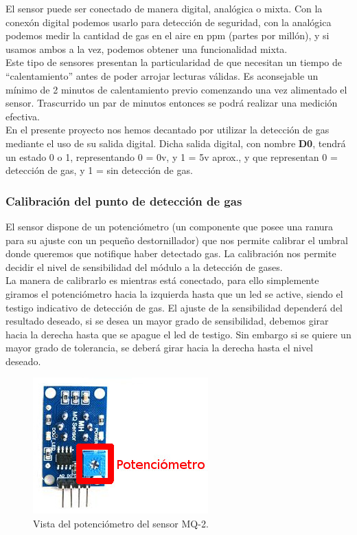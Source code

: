El sensor puede ser conectado de manera digital, analógica o mixta. Con la conexón digital podemos usarlo para detección de seguridad, con la analógica podemos medir la cantidad 
de gas en el aire en ppm (partes por millón), y si usamos ambos a la vez, podemos obtener una funcionalidad mixta.\\

Este tipo de sensores presentan la particularidad de que necesitan un tiempo de “calentamiento” antes de poder arrojar lecturas válidas. Es aconsejable un mínimo de 2 minutos
de calentamiento previo comenzando una vez alimentado el sensor. Trascurrido un par de minutos entonces se podrá realizar una medición efectiva.\\

En el presente proyecto nos hemos decantado por utilizar la detección de gas mediante el uso de su salida digital. Dicha salida digital, con nombre \textbf{D0}, tendrá un estado
0 o 1, representando 0 = 0v, y 1 = 5v aprox., y que representan 0 = detección de gas, y 1 = sin detección de gas. 

\subsubsection{ Calibración del punto de detección de gas}

El sensor dispone de un potenciómetro (un componente que posee una ranura para su ajuste con un pequeño destornillador) que nos permite calibrar el umbral donde queremos que
notifique haber detectado gas. La calibración nos permite decidir el nivel de sensibilidad del módulo a la detección de gases.\\

La manera de calibrarlo es mientras está conectado, para ello simplemente giramos el potenciómetro hacia la izquierda hasta que un led se active, siendo
el testigo indicativo de detección de gas. El ajuste de la sensibilidad dependerá del resultado deseado, si se desea un mayor grado de sensibilidad, debemos girar hacia la derecha
hasta que se apague el led de testigo. Sin embargo si se quiere un mayor grado de tolerancia, se deberá girar hacia la derecha hasta el nivel deseado.\\

\begin{figure}[H]
  \begin{center}
    \includegraphics[scale=0.6]{imagenes/mq2_trasera.jpeg}
  \end{center}
  \caption{Vista del potenciómetro del sensor MQ-2.}
  \label{figura:sensor_mq_2_potenciometro}
\end{figure}

